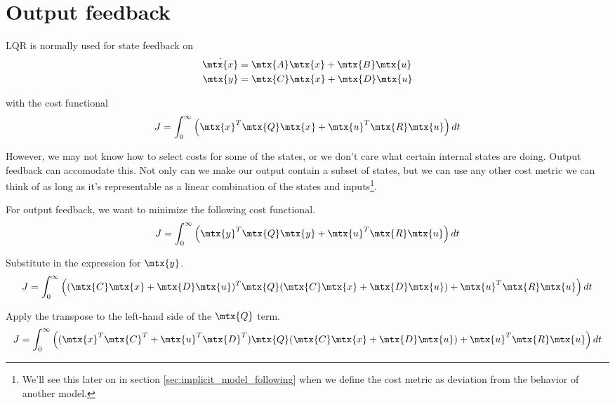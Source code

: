 \section{Output feedback}

LQR is normally used for state feedback on
\begin{align*}
  \dot{\mtx{x}} &= \mtx{A}\mtx{x} + \mtx{B}\mtx{u} \\
  \mtx{y} &= \mtx{C}\mtx{x} + \mtx{D}\mtx{u}
\end{align*}

with the cost functional
\begin{equation*}
  J = \int_0^\infty \left(\mtx{x}^T\mtx{Q}\mtx{x} +
    \mtx{u}^T\mtx{R}\mtx{u}\right) dt
\end{equation*}

However, we may not know how to select costs for some of the states, or we don't
care what certain internal states are doing. Output feedback can accomodate
this. Not only can we make our output contain a subset of states, but we can use
any other cost metric we can think of as long as it's representable as a linear
combination of the states and inputs\footnote{We'll see this later on in section
\ref{sec:implicit_model_following} when we define the cost metric as deviation
from the behavior of another model.}.

For output feedback, we want to minimize the following cost functional.
\begin{equation*}
  J = \int_0^\infty \left(\mtx{y}^T\mtx{Q}\mtx{y} +
    \mtx{u}^T\mtx{R}\mtx{u}\right) dt
\end{equation*}

Substitute in the expression for $\mtx{y}$.
\begin{equation*}
  J = \int_0^\infty \left((\mtx{C}\mtx{x} + \mtx{D}\mtx{u})^T\mtx{Q}
    (\mtx{C}\mtx{x} + \mtx{D}\mtx{u}) + \mtx{u}^T\mtx{R}\mtx{u}\right) dt
\end{equation*}

Apply the transpose to the left-hand side of the $\mtx{Q}$ term.
\begin{equation*}
  J = \int_0^\infty \left((\mtx{x}^T\mtx{C}^T + \mtx{u}^T\mtx{D}^T)\mtx{Q}
    (\mtx{C}\mtx{x} + \mtx{D}\mtx{u}) + \mtx{u}^T\mtx{R}\mtx{u}\right) dt
\end{equation*}

